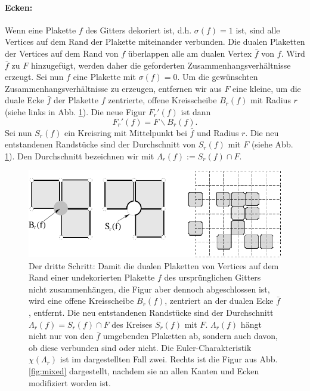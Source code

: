 \paragraph{Ecken:} Wenn eine Plakette $f$ des Gitters dekoriert ist, d.h. $\sigma(f)=1$ ist, sind alle Vertices auf dem Rand der Plakette miteinander verbunden. Die dualen Plaketten der Vertices auf dem Rand von $f$ \"uberlappen alle am dualen Vertex $\bar{f}$ von $f$. Wird $\bar{f}$ zu $F$ hinzugef\"ugt, werden daher die geforderten Zusammenhangsverh\"altnisse erzeugt. Sei nun $f$ eine Plakette mit $\sigma(f)=0$. Um die gew\"unschten Zusammenhangsverh\"altnisse zu erzeugen, entfernen wir aus $F$ eine kleine, um die duale Ecke $\bar{f}$ der Plakette $f$ zentrierte, offene Kreisscheibe $B_r(f)$ mit Radius $r$ (siehe links in Abb. \ref{fig:ecken}). Die neue Figur $F_r'(f)$ ist dann
\begin{equation}
  F_r'(f)=F\backslash B_r(f).
\end{equation}
Sei nun $S_r(f)$ ein Kreisring mit Mittelpunkt bei $\bar{f}$ und Radius $r$. Die neu entstandenen Randst\"ucke sind der Durchschnitt von $S_r(f)$ mit $F$ (siehe Abb. \ref{fig:ecken}). Den Durchschnitt bezeichnen wir mit $\Lambda_r(f):=S_r(f)\cap F$. 
\begin{figure}[tbp]
  \centering
  \includegraphics{./Mixed-figs/ecken}
  \caption{Der dritte Schritt: Damit die dualen Plaketten von Vertices auf dem Rand einer undekorierten Plakette $f$ des urspr\"unglichen Gitters nicht zusammenh\"angen, die Figur aber dennoch abgeschlossen ist, wird eine offene Kreisscheibe $B_r(f)$, zentriert an der dualen Ecke $\bar{f}$, entfernt. Die neu entstandenen Randst\"ucke sind der Durchschnitt $\Lambda_r(f)=S_r(f)\cap F$ des Kreises $S_r(f)$ mit $F$. $\Lambda_r(f)$ h\"angt nicht nur von den $\bar{f}$ umgebenden Plaketten ab, sondern auch davon, ob diese verbunden sind oder nicht. Die Euler-Charakteristik $\chi(\Lambda_r)$ ist im dargestellten Fall zwei. Rechts ist die Figur aus Abb. \ref{fig:mixed} dargestellt, nachdem sie an allen Kanten und Ecken modifiziert worden ist. }
  \label{fig:ecken}
\end{figure}
